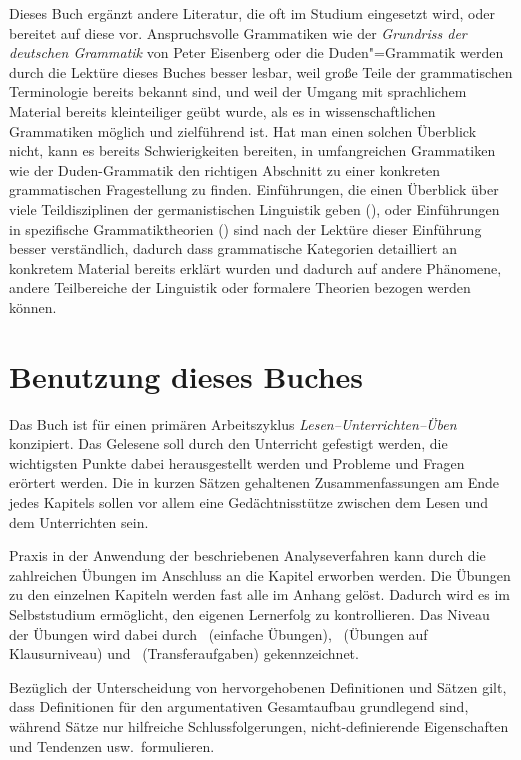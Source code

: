 Dieses Buch ergänzt andere Literatur, die oft im Studium eingesetzt wird, oder bereitet auf diese vor.
Anspruchsvolle Grammatiken wie der \textit{Grundriss der deutschen Grammatik} von Peter Eisenberg \citep{Eisenberg1,Eisenberg2} oder die Duden"=Grammatik \citep{Duden8} werden durch die Lektüre dieses Buches besser lesbar, weil große Teile der grammatischen Terminologie bereits bekannt sind, und weil der Umgang mit sprachlichem Material bereits kleinteiliger geübt wurde, als es in wissenschaftlichen Grammatiken möglich und zielführend ist.
Hat man einen solchen Überblick nicht, kann es bereits Schwierigkeiten bereiten, in umfangreichen Grammatiken wie der Duden-Grammatik den richtigen Abschnitt zu einer konkreten grammatischen Fragestellung zu finden.
Einführungen, die einen Überblick über viele Teildisziplinen der germanistischen Linguistik geben (\zB \citealp{EgL07,SgL07}), oder Einführungen in spezifische Grammatiktheorien (\zB \citealp{Grewendorf02, Mueller08}) sind nach der Lektüre dieser Einführung besser verständlich, dadurch dass grammatische Kategorien detailliert an konkretem Material bereits erklärt wurden und dadurch auf andere Phänomene, andere Teilbereiche der Linguistik oder formalere Theorien bezogen werden können.

\section*{Benutzung dieses Buches}

Das Buch ist für einen primären Arbeitszyklus \textit{Lesen--Unterrichten--Üben} konzipiert.
Das Gelesene soll durch den Unterricht gefestigt werden, die wichtigsten Punkte dabei herausgestellt werden und Probleme und Fragen erörtert werden.
Die in kurzen Sätzen gehaltenen Zusammenfassungen am Ende jedes Kapitels sollen vor allem eine Gedächtnisstütze zwischen dem Lesen und dem Unterrichten sein.

Praxis in der Anwendung der beschriebenen Analyseverfahren kann durch die zahlreichen Übungen im Anschluss an die Kapitel erworben werden.
Die Übungen zu den einzelnen Kapiteln werden fast alle im Anhang gelöst.
Dadurch wird es im Selbststudium ermöglicht, den eigenen Lernerfolg zu kontrollieren.
Das Niveau der Übungen wird dabei durch \onestar\ (einfache Übungen), \twostar\ (Übungen auf Klausurniveau) und \tristar\ (Transferaufgaben) gekennzeichnet.

Bezüglich der Unterscheidung von hervorgehobenen Definitionen und Sätzen gilt, dass Definitionen für den argumentativen Gesamtaufbau grundlegend sind, während Sätze nur hilfreiche Schlussfolgerungen, nicht-definierende Eigenschaften und Tendenzen usw.\ formulieren.

